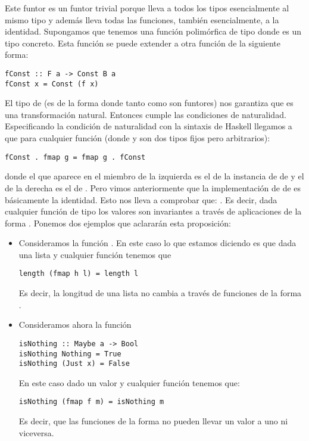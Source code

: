 Este funtor es un funtor trivial porque lleva a todos los tipos
esencialmente al mismo tipo y además lleva todas las funciones,
también esencialmente, a la
identidad.
Supongamos que tenemos una función polimórfica de tipo
 donde  es un tipo concreto. Esta función
se puede extender a otra función
 de la siguiente forma:
\begin{verbatim}
fConst :: F a -> Const B a
fConst x = Const (f x)
\end{verbatim}
El tipo de  (es de la forma  donde tanto
 como  son funtores) nos garantiza que es una transformación
natural. Entonces cumple las condiciones de naturalidad. Especificando
la condición de naturalidad con la sintaxis de Haskell llegamos a
que para cualquier función  (donde 
y  son dos tipos fijos pero arbitrarios):
\begin{verbatim}
fConst . fmap g = fmap g . fConst
\end{verbatim}
donde el  que aparece en el miembro
de la izquierda es el de la instancia
de  de  y el de
la derecha es el de .
Pero vimos anteriormente que la implementación de 
de  es básicamente la identidad.
Esto nos lleva a comprobar que:
. Es decir, dada cualquier función de tipo
 los valores  son invariantes a través
de aplicaciones de la forma . Ponemos dos ejemplos
que aclararán esta proposición:

\begin{itemize}
\item Consideramos la función . En este
  caso lo que estamos diciendo es que dada una lista
   y cualquier función  tenemos que
\begin{verbatim}
length (fmap h l) = length l
\end{verbatim}
   Es decir, la longitud de
  una lista no cambia a través de funciones de la forma
  .
\item Consideramos ahora la función
\begin{verbatim}
isNothing :: Maybe a -> Bool
isNothing Nothing = True
isNothing (Just x) = False
\end{verbatim}
En este caso dado un valor  y cualquier función
 tenemos que:
\begin{verbatim}
isNothing (fmap f m) = isNothing m
\end{verbatim}
Es decir, que las funciones de la forma  no pueden llevar
un valor  a uno
 ni viceversa.
\end{itemize}

